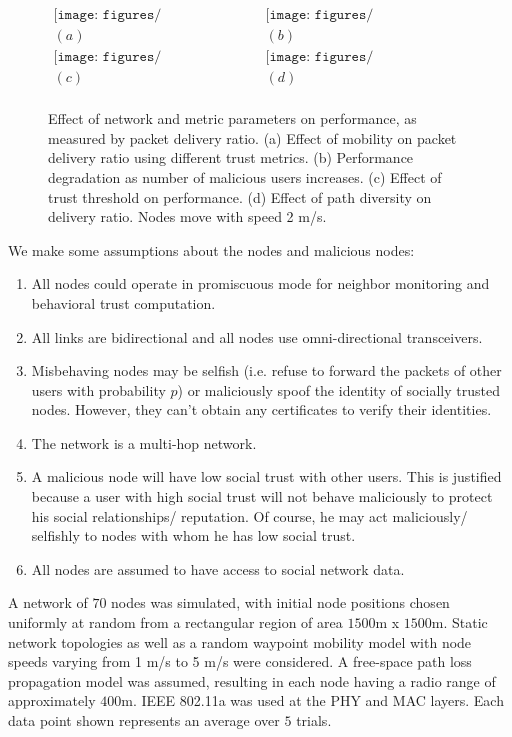 \documentclass[conference]{IEEEtran}
\begin{document}
\begin{figure*}[ht]
\centering
$\begin{array}{cc}
\texttt{[image: figures/PDR\_vs\_mobility.eps]} &
\texttt{[image: figures/Figure\_7\_malicious.eps]} \\
(a) & (b) \\
\texttt{[image: figures/Figure\_8\_threshold.eps]} &
\texttt{[image: figures/Figure\_9\_diversity.eps]} \\
(c) & (d) \\
\end{array}$
\caption{Effect of network and metric parameters on performance, as measured by packet delivery ratio. (a) Effect of mobility on packet delivery ratio using different trust metrics. (b) Performance degradation as number of malicious users increases.  (c) Effect of trust threshold on performance. (d) Effect of path diversity on delivery ratio.  Nodes move with speed 2 m/s. }\label{fig:parameters}
\end{figure*}
We make some assumptions about the nodes and malicious nodes:
\begin{enumerate}
\item All nodes could operate in promiscuous mode for neighbor monitoring and behavioral trust computation.
\item All links are bidirectional and all nodes use omni-directional transceivers.
\item Misbehaving nodes may be selfish (i.e. refuse to forward the packets of other users with probability $p$) or maliciously spoof the identity of socially trusted nodes. However, they can't obtain any certificates to verify their identities.
\item The network is a multi-hop network.
\item A malicious node will have low social trust with other users. This is justified because a user with high social trust will not behave maliciously to protect his social relationships/ reputation. Of course, he may act maliciously/ selfishly to nodes with whom he has low social trust.
\item All nodes are assumed to have access to social network data.
\end{enumerate}

A network of $70$ nodes was simulated, with initial node positions chosen uniformly at random from a rectangular region of area $1500$m x $1500$m.  Static network topologies as well as a random waypoint mobility model with node speeds varying from 1 m/s to 5 m/s were considered.  A free-space path loss propagation model was assumed, resulting in each node having a radio range of approximately $400$m.  IEEE 802.11a was used at the PHY and MAC layers.  Each data point shown represents an average over $5$ trials.
\end{document}
